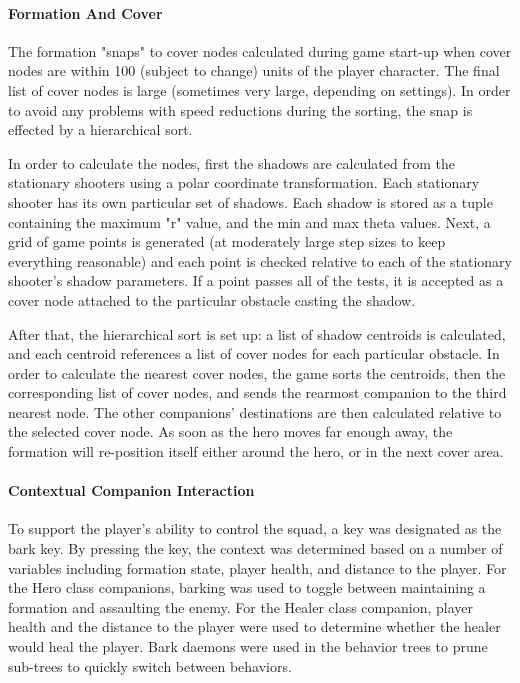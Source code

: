 \documentclass[11pt]{article}
\begin{document}
\paragraph{Formation And Cover}
The formation "snaps" to cover nodes calculated during game start-up when cover nodes are within 100 (subject to change) units of the player character.  The final list of cover nodes is large (sometimes very large, depending on settings).  In order to avoid any problems with speed reductions during the sorting, the snap is effected by a hierarchical sort.  

In order to calculate the nodes, first the shadows are calculated from the stationary shooters using a polar coordinate transformation.  Each stationary shooter has its own particular set of shadows.  Each shadow is stored as a tuple containing the maximum "r" value, and the min and max theta values.  Next, a grid of game points is generated (at moderately large step sizes to keep everything reasonable) and each point is checked relative to each of the stationary shooter's shadow parameters.  If a point passes all of the tests, it is accepted as a cover node attached to the particular obstacle casting the shadow.  

After that, the hierarchical sort is set up: a list of shadow centroids is calculated, and each centroid references a list of cover nodes for each particular obstacle. In order to calculate the nearest cover nodes, the game sorts the centroids, then the corresponding list of cover nodes, and sends the rearmost companion to the third nearest node.  The other companions' destinations are then calculated relative to the selected cover node.  As soon as the hero moves far enough away, the formation will re-position itself either around the hero, or in the next cover area.     

\paragraph{Contextual Companion Interaction}
To support the player's ability to control the squad, a key was designated as the bark key. By pressing the key, the context was determined based on a number of variables including formation state, player health, and distance to the player. For the Hero class companions, barking was used to toggle between maintaining a formation and assaulting the enemy. For the Healer class companion, player health and the distance to the player were used to determine whether the healer would heal the player. Bark daemons were used in the behavior trees to prune sub-trees to quickly switch between behaviors. 
\end{document}
